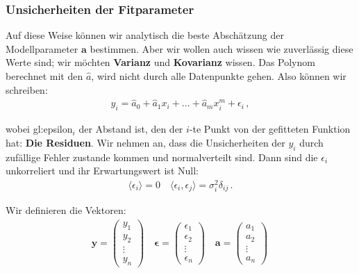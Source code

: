 \subsubsection{Unsicherheiten der Fitparameter}
\label{subsubsec:vl8-3}

Auf diese Weise k\"onnen wir analytisch die beste Absch\"atzung der Modellparameter $\boldsymbol{a}$ bestimmen. Aber wir wollen auch wissen wie zuverl\"assig diese Werte sind; wir m\"ochten \textbf{Varianz} und \textbf{Kovarianz} wissen. Das Polynom berechnet mit den $\hat{a}$, wird nicht durch alle Datenpunkte gehen. Also k\"onnen wir schreiben:
\begin{align}
y_i = \hat{a}_0 + \hat{a}_1 x_i + ... + \hat{a}_m x_i^m + \epsilon_i\,,
\label{eq:vl8-30}
\end{align}

wobei \gls{gl:epsilon}$_i$ der Abstand ist, den der $i$-te Punkt von der gefitteten Funktion hat: \textbf{Die Residuen}. Wir nehmen an, dass die Unsicherheiten der $y_i$ durch zuf\"allige Fehler zustande kommen und normalverteilt sind. Dann sind die $\epsilon_i$ unkorreliert und ihr Erwartungswert ist Null:
\begin{align}
\langle \epsilon_i \rangle = 0 \quad \langle \epsilon_i, \epsilon_j \rangle = \sigma_i^2 \delta_{ij}\,.
\label{eq:vl8-31}
\end{align}

Wir definieren die Vektoren:
\begin{align}
\boldsymbol{y} = 
\begin{pmatrix}
y_1    \\
y_2    \\
\vdots \\
y_n
\end{pmatrix}\quad
\boldsymbol{\epsilon} = 
\begin{pmatrix}
\epsilon_1 \\
\epsilon_2 \\
\vdots     \\
\epsilon_n
\end{pmatrix}\quad
\boldsymbol{a} = 
\begin{pmatrix}
a_1    \\
a_2    \\
\vdots \\
a_n
\end{pmatrix}\,
\label{eq:vl8-32}
\end{align}

